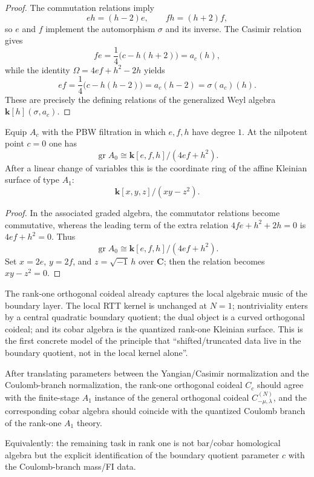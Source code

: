 \begin{proof}
The commutation relations imply
\[
eh=(h-2)e,
\qquad fh=(h+2)f,
\]
so $e$ and $f$ implement the automorphism $\sigma$ and its inverse.  The Casimir
relation gives
\[
fe=\frac{1}{4}\bigl(c-h(h+2)\bigr)=a_c(h),
\]
while the identity $\Omega=4ef+h^2-2h$ yields
\[
ef=\frac{1}{4}\bigl(c-h(h-2)\bigr)=a_c(h-2)=\sigma(a_c)(h).
\]
These are precisely the defining relations of the generalized Weyl algebra
$\mathbf{k}[h](\sigma,a_c)$.
\end{proof}

\begin{corollary}
\label{cor:kleinian-associated-graded}
Equip $A_c$ with the PBW filtration in which $e,f,h$ have degree $1$.  At the
nilpotent point $c=0$ one has
\[
\operatorname{gr}A_0
\cong
\mathbf{k}[e,f,h]/(4ef+h^2).
\]
After a linear change of variables this is the coordinate ring of the affine
Kleinian surface of type $A_1$:
\[
\mathbf{k}[x,y,z]/(xy-z^2).
\]
\end{corollary}

\begin{proof}
In the associated graded algebra, the commutator relations become commutative,
whereas the leading term of the extra relation $4fe+h^2+2h=0$ is
$4ef+h^2=0$.  Thus
\[
\operatorname{gr}A_0\cong \mathbf{k}[e,f,h]/(4ef+h^2).
\]
Set $x=2e$, $y=2f$, and $z=\sqrt{-1}\,h$ over $\mathbf{C}$; then the relation
becomes $xy-z^2=0$.
\end{proof}

\begin{remark}[Interpretation]
\label{rem:rank-one-interpretation}
The rank-one orthogonal coideal already captures the local algebraic music of
the boundary layer.  The local RTT kernel is unchanged at $N=1$;
nontriviality enters by a central quadratic boundary quotient; the dual object is
a curved orthogonal coideal; and its cobar algebra is the quantized rank-one
Kleinian surface.  This is the first concrete model of the principle that
``shifted/truncated data live in the boundary quotient, not in the local kernel
alone''.
\end{remark}

\begin{conjecture}
\label{conj:rank-one-bfn-matching}
After translating parameters between the Yangian/Casimir normalization and the
Coulomb-branch normalization, the rank-one orthogonal coideal $C_c$ should agree
with the finite-stage $A_1$ instance of the general orthogonal coideal
$C_{-\mu,\lambda}^{(N)}$, and the corresponding cobar algebra should coincide
with the quantized Coulomb branch of the rank-one $A_1$ theory.

Equivalently: the remaining task in rank one is not bar/cobar homological
algebra but the explicit identification of the boundary quotient parameter $c$
with the Coulomb-branch mass/FI data.
\end{conjecture}

